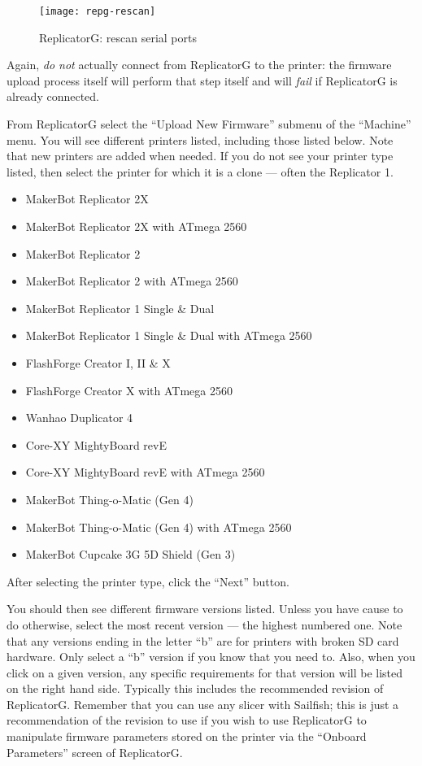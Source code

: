 \begin{figure}[!htbp]
  \centering
    \texttt{[image: repg-rescan]}
    \caption{ReplicatorG: rescan serial ports}
  \label{fig:repg-rescan}
\end{figure}

Again, \emph{do not} actually connect from ReplicatorG to the printer: the
firmware upload process itself will perform that step itself and will
\emph{fail} if ReplicatorG is already connected.

From ReplicatorG select the ``Upload New Firmware'' submenu of the
``Machine'' menu. You will see different printers listed, including
those listed below.  Note that new printers are added when needed.  If
you do not see your printer type listed, then select the printer for
which it is a clone --- often the Replicator 1.

\begin{itemize}
\item MakerBot Replicator 2X
\item MakerBot Replicator 2X with ATmega 2560
\item MakerBot Replicator 2
\item MakerBot Replicator 2 with ATmega 2560
\item MakerBot Replicator 1 Single \& Dual
\item MakerBot Replicator 1 Single \& Dual with ATmega 2560
\item FlashForge Creator I, II \& X
\item FlashForge Creator X with ATmega 2560
\item Wanhao Duplicator 4
\item Core-XY MightyBoard revE
\item Core-XY MightyBoard revE with ATmega 2560
\item MakerBot Thing-o-Matic (Gen 4)
\item MakerBot Thing-o-Matic (Gen 4) with ATmega 2560
\item MakerBot Cupcake 3G 5D Shield (Gen 3)
\end{itemize}

\noindent After selecting the printer type, click the ``Next'' button.

You should then see different firmware versions listed.  Unless you
have cause to do otherwise, select the most recent version --- the
highest numbered one.  Note that any versions
ending in the letter ``b'' are for printers with broken \gls{SD card} hardware.
Only select a ``b'' version if you know that you need to.  Also,
when you click on a given version, any specific requirements for
that version will be listed on the right hand side.  Typically this
includes the recommended revision of ReplicatorG.  Remember that you
can use any \gls{slicer} with Sailfish; this is just a recommendation of the revision
to use if you wish to use ReplicatorG to manipulate firmware parameters
stored on the printer via the ``Onboard Parameters'' screen of ReplicatorG.

